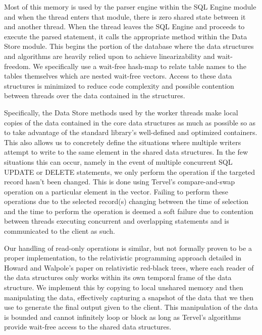 \documentclass[letter,11pt]{article}
\begin{document}
Most of this memory is used by the parser engine within the SQL Engine module and when the 
thread enters that module, there is zero shared state between it and another thread. When the thread
leaves the SQL Engine and proceeds to execute the parsed statement, it calls the appropriate
method within the Data Store module. This begins the portion of the database where the data 
structures and algorithms are heavily relied upon to achieve linearizability and wait-freedom.
We specifically use a wait-free hash-map to relate table names to the tables themselves which are nested
wait-free vectors. Access to these data structures is minimized to reduce code complexity and 
possible contention between threads over the data contained in the structures.
\par\vspace{\baselineskip}
Specifically, the Data Store methods used by the worker threads make local copies of the data contained
in the core data structures as much as possible so as to take advantage of the standard library's
well-defined and optimized containers. This also allows us to concretely define the situations where 
multiple writers attempt to write to the same element in the shared data structures. In the few situations
this can occur, namely in the event of multiple concurrent SQL UPDATE or DELETE statements, we only perform
the operation if the targeted record hasn't been changed. This is done using Tervel's compare-and-swap 
operation on a particular element in the vector. Failing to perform these operations due to the 
selected record(s) changing between the time of selection and the time to perform the operation
is deemed a soft failure due to contention between threads executing concurrent and overlapping statements
and is communicated to the client as such.
\par\vspace{\baselineskip}
Our handling of read-only operations is similar, but not formally proven to be a proper implementation, 
to the relativistic programming approach detailed in Howard and Walpole's paper on relativistic 
red-black trees, where each reader of the data structures only works within its own temporal 
frame of the data structure\cite{rbtree}. We implement this by copying to local unshared 
memory and then manipulating the data, effectively capturing a snapshot of the data that 
we then use to generate the final output given to the client. This manipulation of the 
data is bounded and cannot infinitely loop or block as long as Tervel's algorithms provide 
wait-free access to the shared data structures.
\end{document}
